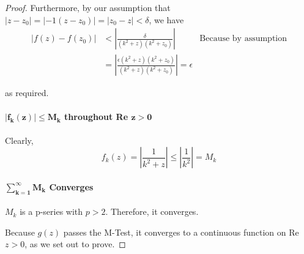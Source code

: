 \documentclass[11pt]{article}
\begin{document}
\begin{enumerate}
\begin{enumerate}
\begin{proof}
			Furthermore, by our assumption that  $|z - z_0| = |-1(z - z_0)| = |z_0 - z| < \delta$, we have
			\[\begin{aligned}
			| f(z) - f(z_0) |
			&< |\frac{\delta}{(k^2 + z)(k^2 + z_0)}| & \text{Because by assumption}\\
			&= |\frac{\epsilon(k^2 + z)(k^2 + z_0)}{(k^2 + z)(k^2 + z_0)}| = \epsilon
			\end{aligned}\]
			
			as required.
			
			\paragraph{$\mathbf{|f_k(z)| \leq M_k}$ throughout Re $\mathbf{z > 0}$}
			
			Clearly,
			\[f_k(z) = |\frac{1}{k^2 + z}| \leq |\frac{1}{k^2}| = M_k \]
			
			\paragraph{$\mathbf{\sum^{\infty}_{k=1} M_k}$ Converges} $M_k$ is a p-series with $p > 2$. Therefore, it converges.
			
		\bigskip
			
		Because $g(z)$ passes the M-Test, it converges to a continuous function on Re $z > 0$, as we set out to prove.
			
		\end{proof}
	\end{enumerate}
\end{enumerate}
\end{document}
